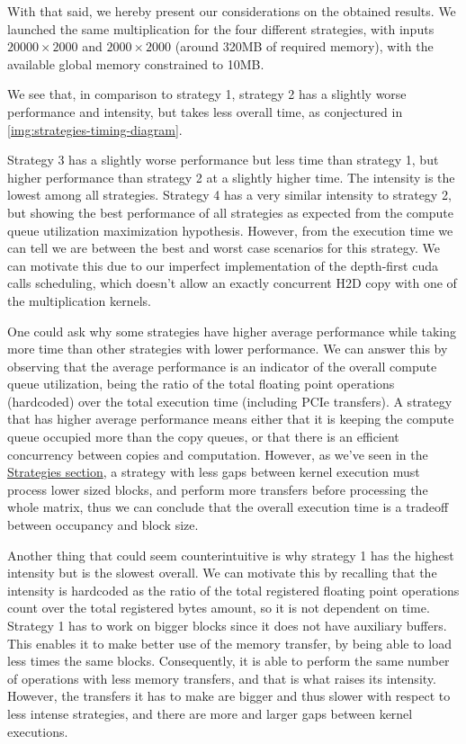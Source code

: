 With that said, we hereby present our considerations on the obtained results.
We launched the same multiplication for the four different strategies, with inputs $20000 \times 2000$ and $2000 \times 2000$ (around 320MB of required memory), with the available global memory constrained to 10MB.

We see that, in comparison to strategy 1, strategy 2 has a slightly worse performance and intensity, but takes less overall time, as conjectured in \ref{img:strategies-timing-diagram}.

Strategy 3 has a slightly worse performance but less time than strategy 1, but higher performance than strategy 2 at a slightly higher time. The intensity is the lowest among all strategies.
Strategy 4 has a very similar intensity to strategy 2, but showing the best performance of all strategies as expected from the compute queue utilization maximization hypothesis. However, from the execution time we can tell we are between the best and worst case scenarios for this strategy. We can motivate this due to our imperfect implementation of the depth-first cuda calls scheduling, which doesn't allow an exactly concurrent H2D copy with one of the multiplication kernels.


One could ask why some strategies have higher average performance while taking more time than other strategies with lower performance. We can answer this by observing that the average performance is an indicator of the overall compute queue utilization, being the ratio of the total floating point operations (hardcoded) over the total execution time (including PCIe transfers). A strategy that has higher average performance means either that it is keeping the compute queue occupied more than the copy queues, or that there is an efficient concurrency between copies and computation. However, as we've seen in the \hyperref[sec:strategies]{Strategies section}, a strategy with less gaps between kernel execution must process lower sized blocks, and perform more transfers before processing the whole matrix, thus we can conclude that the overall execution time is a tradeoff between occupancy and block size.

Another thing that could seem counterintuitive is why strategy 1 has the highest intensity but is the slowest overall. We can motivate this by recalling that the intensity is hardcoded as the ratio of the total registered floating point operations count over the total registered bytes amount, so it is not dependent on time. Strategy 1 has to work on bigger blocks since it does not have auxiliary buffers. This enables it to make better use of the memory transfer, by being able to load less times the same blocks. Consequently, it is able to perform the same number of operations with less memory transfers, and that is what raises its intensity. However, the transfers it has to make are bigger and thus slower with respect to less intense strategies, and there are more and larger gaps between kernel executions.

